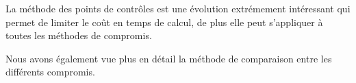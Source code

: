 	La méthode des points de contrôles est une évolution extrémement intéressant qui permet de limiter le coût en temps de calcul, de plus elle peut s'appliquer à toutes les méthodes de compromis.

	\bigskip

	Nous avons également vue plus en détail la méthode de comparaison entre les différents compromis.

\endinput{}
